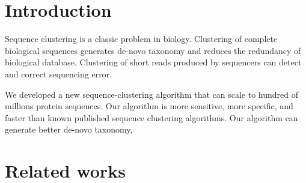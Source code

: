 \documentclass[]{article}
\title{}
\author{}
\begin{document}
\maketitle

\begin{abstract}

\end{abstract}

\section{Introduction}

Sequence clustering is a classic problem in biology.
Clustering of complete biological sequences generates de-novo taxonomy and reduces the redundancy of biological database.
Clustering of short reads produced by sequencers can detect and correct sequencing error.

We developed a new sequence-clustering algorithm that can scale to hundred of millions protein sequences.
Our algorithm is more sensitive, more specific, and faster than known published sequence clustering algorithms.
Our algorithm can generate better de-novo taxonomy, 

\section{Related works}
\end{document}
